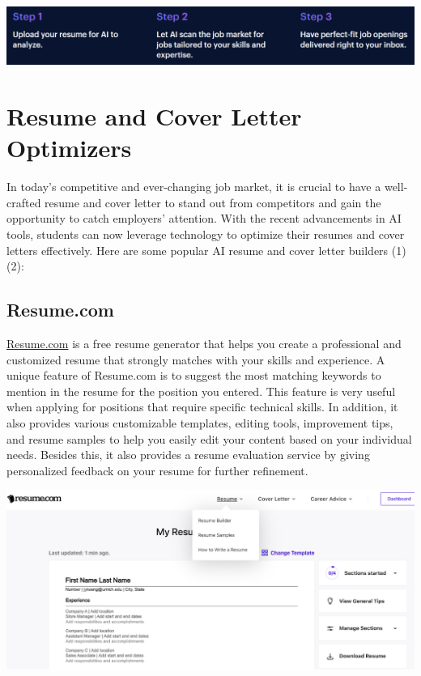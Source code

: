 \documentclass[
]{book}
\begin{document}
\includegraphics[width=5.66667in,height=\textheight]{pyjama jobs.png}

\hypertarget{resume-and-cover-letter-optimizers}{%
\chapter{Resume and Cover Letter Optimizers}\label{resume-and-cover-letter-optimizers}}

In today's competitive and ever-changing job market, it is crucial to have a well-crafted resume and cover letter to stand out from competitors and gain the opportunity to catch employers' attention. With the recent advancements in AI tools, students can now leverage technology to optimize their resumes and cover letters effectively. Here are some popular AI resume and cover letter builders (1) (2):

\hypertarget{resume.com}{%
\section{Resume.com}\label{resume.com}}

\href{https://www.resume.com/}{Resume.com} is a free resume generator that helps you create a professional and customized resume that strongly matches with your skills and experience. A unique feature of Resume.com is to suggest the most matching keywords to mention in the resume for the position you entered. This feature is very useful when applying for positions that require specific technical skills. In addition, it also provides various customizable templates, editing tools, improvement tips, and resume samples to help you easily edit your content based on your individual needs. Besides this, it also provides a resume evaluation service by giving personalized feedback on your resume for further refinement.

\includegraphics[width=5.90625in,height=\textheight]{Resume.com pic.png}
\end{document}
